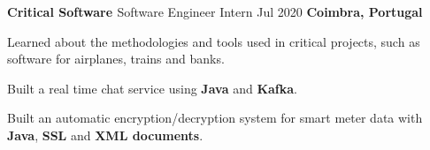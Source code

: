 \begin{cventries}

  \cventry
    {\textbf{Critical Software \href{https://www.criticalsoftware.com/en}{\faExternalLink}}} %
    {Software Engineer Intern} %
    {Jul 2020} %
    {\textbf{Coimbra, Portugal}} %
    {
      \begin{cvitems} %
        \item {Learned about the methodologies and tools used in critical projects, such as software for airplanes, trains and banks.}
        \item {Built a real time chat service using \textbf{Java} and \textbf{Kafka}.}
        \item {Built an automatic encryption/decryption system for smart meter data with \textbf{Java}, \textbf{SSL} and \textbf{XML documents}.}
      \end{cvitems}
    }




\end{cventries}
